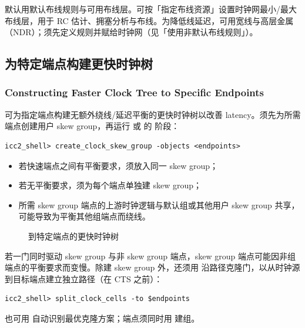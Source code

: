 默认用默认布线规则与可用布线层。可按「指定布线资源」设置时钟网最小/最大布线层，用于 RC 估计、拥塞分析与布线。为降低线延迟，可用宽线与高层金属（NDR）；须先定义规则并赋给时钟网（见「使用非默认布线规则」）。

\subsection{为特定端点构建更快时钟树}
\subsubsection*{Constructing Faster Clock Tree to Specific Endpoints}

可为指定端点构建无额外绕线/延迟平衡的更快时钟树以改善 latency。须先为所需端点创建用户 skew group，再运行  或  的  阶段：
\begin{lstlisting}
icc2_shell> create_clock_skew_group -objects <endpoints>
\end{lstlisting}
\begin{noteBox}
\begin{itemize}
  \item 若快速端点之间有平衡要求，须放入同一 skew group；
  \item 若无平衡要求，须为每个端点单独建 skew group；
  \item 所需 skew group 端点的上游时钟逻辑与默认组或其他用户 skew group 共享，可能导致为平衡其他组端点而绕线。
\end{itemize}
\end{noteBox}

\begin{figure}[htbp]
\centering
{}
\caption{到特定端点的更快时钟树}
\label{fig:cts-faster}
\end{figure}

若一门同时驱动 skew group 与非 skew group 端点，skew group 端点可能因非组端点的平衡要求而变慢。除建 skew group 外，还须用  沿路径克隆门，以从时钟源到目标端点建立独立路径（在 CTS 之前）：
\begin{lstlisting}
icc2_shell> split_clock_cells -to $endpoints
\end{lstlisting}
也可用  自动识别最优克隆方案；端点须同时用  建组。

